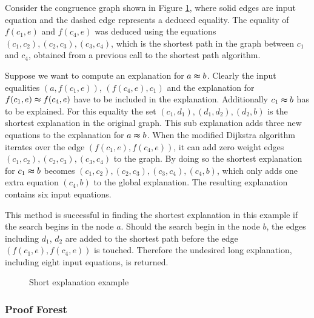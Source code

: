\begin{example}
Consider the congruence graph shown in Figure \ref{fig:short_expl}, where solid edges are input equation and the dashed edge represents a deduced equality.
The equality of $f(c_1,e)$ and $f(c_4,e)$ was deduced using the equations $(c_1,c_2),(c_2,c_3),(c_3,c_4)$, which is the shortest path in the graph between $c_1$ and $c_4$, obtained from a previous call to the shortest path algorithm.

Suppose we want to compute an explanation for $a \thickapprox b$.
Clearly the input equalities $(a,f(c_1,e))$, $(f(c_4,e),c_1)$ and the explanation for $f(c_1,e) \thickapprox f(c_4,e)$ have to be included in the explanation.
Additionally $c_1 \thickapprox b$ has to be explained.
For this equality the set $(c_1,d_1),(d_1,d_2),(d_2,b)$ is the shortest explanation in the original graph.
This sub explanation adds three new equations to the explanation for $a \thickapprox b$.
When the modified Dijkstra algorithm iterates over the edge $(f(c_1,e),f(c_4,e))$, it can add zero weight edges $(c_1,c_2),(c_2,c_3),(c_3,c_4)$ to the graph.
By doing so the shortest explanation for $c_1 \thickapprox b$ becomes $(c_1,c_2),(c_2,c_3),(c_3,c_4),(c_4,b)$, which only adds one extra equation $(c_4,b)$ to the global explanation.
The resulting explanation contains six input equations.

This method is successful in finding the shortest explanation in this example if the search begins in the node $a$.
Should the search begin in the node $b$, the edges including $d_1$, $d_2$ are added to the shortest path before the edge $(f(c_1,e),f(c_4,e))$ is touched.
Therefore the undesired long explanation, including eight input equations, is returned.

\begin{figure}[!h]

\caption{Short explanation example}
\label{fig:short_expl}
\end{figure}

\label{ex:short_expl}
\end{example}





\FloatBarrier

\subsubsection*{Proof Forest}

